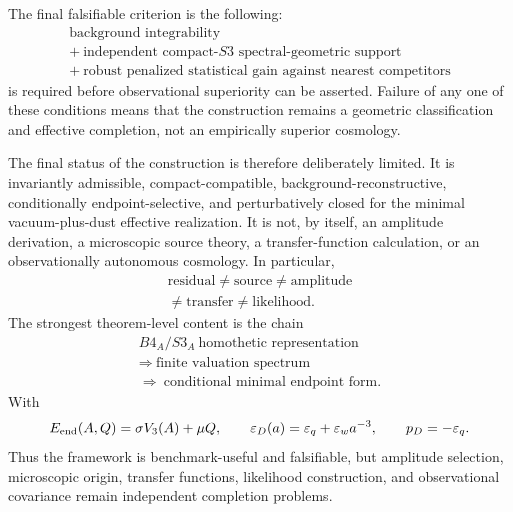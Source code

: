 \documentclass[11pt,a4paper]{article}
\def\Bfour{B4}%
\def\Sthree{S3}%
\numberwithin{equation}{section}
\theoremstyle{remark}
\newcommand{\Sthree}{S^3}
\newcommand{\Bfour}{B^4}
\newcommand{\epsD}{\varepsilon_D}
\newcommand{\pD}{p_D}
\begin{document}
The final falsifiable criterion is the following:
\begin{equation}
\begin{array}{l}
\text{background integrability}\\[1mm]
+\ \text{independent compact-}\Sthree\text{ spectral-geometric support}\\[1mm]
+\ \text{robust penalized statistical gain against nearest competitors}
\end{array}
\end{equation}
is required before observational superiority can be asserted. Failure of any one of these conditions means that the construction remains a geometric classification and effective completion, not an empirically superior cosmology.

The final status of the construction is therefore deliberately limited. It is invariantly admissible, compact-compatible, background-reconstructive, conditionally endpoint-selective, and perturbatively closed for the minimal vacuum-plus-dust effective realization. It is not, by itself, an amplitude derivation, a microscopic source theory, a transfer-function calculation, or an observationally autonomous cosmology. In particular,
\begin{equation}
\begin{array}{c}
\text{residual}\neq\text{source}\neq\text{amplitude}\\[1mm]
\neq\text{transfer}\neq\text{likelihood}.
\end{array}
\end{equation}
The strongest theorem-level content is the chain
\begin{equation}
\begin{array}{c}
\Bfour_A/\Sthree_A\ \text{homothetic representation}\\[1mm]
\Longrightarrow\ \text{finite valuation spectrum}\\[1mm]
\Longrightarrow\ \text{conditional minimal endpoint form}.
\end{array}
\end{equation}
With
\begin{equation}
E_{\rm end}(A,Q)=\sigma V_3(A)+\mu Q,
\qquad
\epsD(a)=\varepsilon_q+\varepsilon_w a^{-3},
\qquad
\pD=-\varepsilon_q .
\end{equation}
Thus the framework is benchmark-useful and falsifiable, but amplitude selection, microscopic origin, transfer functions, likelihood construction, and observational covariance remain independent completion problems.
\end{document}
